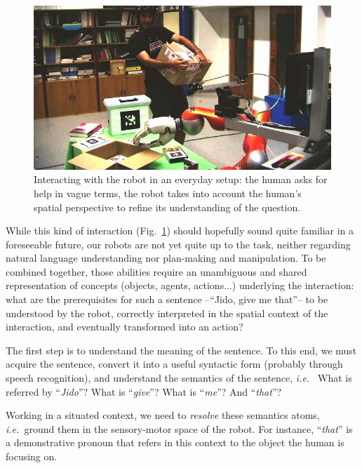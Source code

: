 \documentclass{svmult}
\newcommand{\ie}{{\textit{i.e.~}}}
\begin{document}
\begin{figure}%
	\centering
	\includegraphics[width=1.0\linewidth]{figs/pt.jpg} 
	\caption{Interacting with
	the robot in an everyday setup: the human asks for help in vague terms, the
	robot takes into account the human's spatial perspective to refine its
	understanding of the question.} 
	\label{fig|vpt} 
\end{figure}


While this kind of interaction (Fig.~\ref{fig|vpt}) should hopefully sound
quite familiar in a foreseeable future, our robots are not yet quite up to the
task, neither regarding natural language understanding nor plan-making and
manipulation.  To be combined together, those abilities require an unambiguous
and shared representation of concepts (objects, agents, actions...) underlying
the interaction: what are the prerequisites for such a sentence --``Jido, give
me that''-- to be understood by the robot, correctly interpreted in the spatial
context of the interaction, and eventually transformed into an action?

The first step is to understand the meaning of the sentence. To this end, we
must acquire the sentence, convert it into a useful syntactic form (probably
through speech recognition), and understand the semantics of the sentence, \ie
What is referred by ``\textit{Jido}''? What is ``\textit{give}''? What is
``\textit{me}''? And ``\textit{that}''?

Working in a situated context, we need to \emph{resolve} these semantics atoms,
\ie ground them in the sensory-motor space of the robot. For instance,
``\textit{that}'' is a demonstrative pronoun that refers in this context to the
object the human is focusing on.
\end{document}
